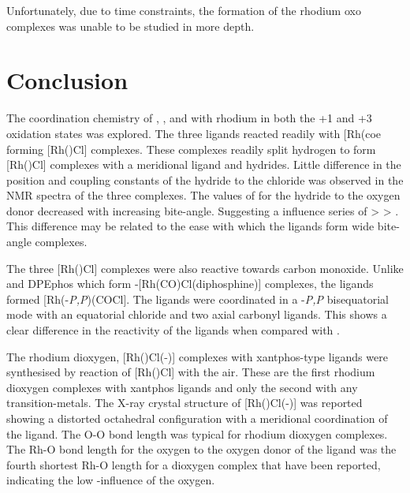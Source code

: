 Unfortunately, due to time constraints, the formation of the rhodium oxo complexes was unable to be studied in more depth.  

\section{Conclusion}

The coordination chemistry of \tBuSixantphos{}, \tButhixantphos{}, and \tBuxantphos{} with rhodium in both the +1 and +3 oxidation states was explored.  The three ligands reacted readily with [Rh(coe\ce{)2Cl]2} forming [Rh(\tBuxantphosk)Cl] complexes.  These complexes readily split hydrogen to form  [Rh(\tBuxantphosk)Cl] complexes with a meridional \tBuxantphos{} ligand and \cis{} hydrides.  Little difference in the position and coupling constants of the hydride \trans{} to the chloride was observed in the \proton{} NMR spectra of the three complexes.  The values of \JRhH{} for the hydride \trans{} to the oxygen donor decreased with increasing bite-angle.  Suggesting a \trans{} influence series of \tBuxantphos{} \textgreater{} \tButhixantphos{} \textgreater{} \tBusixantphos{}.  This difference may be related to the ease with which the ligands form wide bite-angle complexes.

The three [Rh(\tBuxantphosk)Cl] complexes were also reactive towards carbon monoxide.  Unlike \Phxantphos{} and DPEphos{} which form \trans-[Rh(CO)Cl(diphosphine)] complexes, the \tBuxantphos{} ligands formed [Rh(\tBuxantphos\dento{}-\emph{P,P}\textprime{})(COCl].  The \tBuxantphos{} ligands were coordinated in a \dento{}-\emph{P,P}\textprime{} bisequatorial mode with an equatorial chloride and two axial carbonyl ligands.  This shows a clear difference in the reactivity of the \tBuxantphos{} ligands when compared with \Phxantphos.

The rhodium dioxygen, [Rh(\tBuxantphos)Cl(-)] complexes with xantphos-type ligands were synthesised by reaction of  [Rh(\tBuxantphosk)Cl] with the air.  These are the first rhodium dioxygen complexes with xantphos ligands and only the second with any transition-metals.  The X-ray crystal structure of [Rh(\tBuxantphos)Cl(-)] was reported showing a distorted octahedral configuration with a meridional coordination of the \tBuxantphos{} ligand.  The O-O bond length was typical for rhodium dioxygen complexes.  The Rh-O bond length for the oxygen \trans{} to the oxygen donor of the \tBuxantphos{} ligand was the fourth shortest Rh-O length for a dioxygen complex that have been reported, indicating the low \trans-influence of the \tBuxantphos{} oxygen.  

